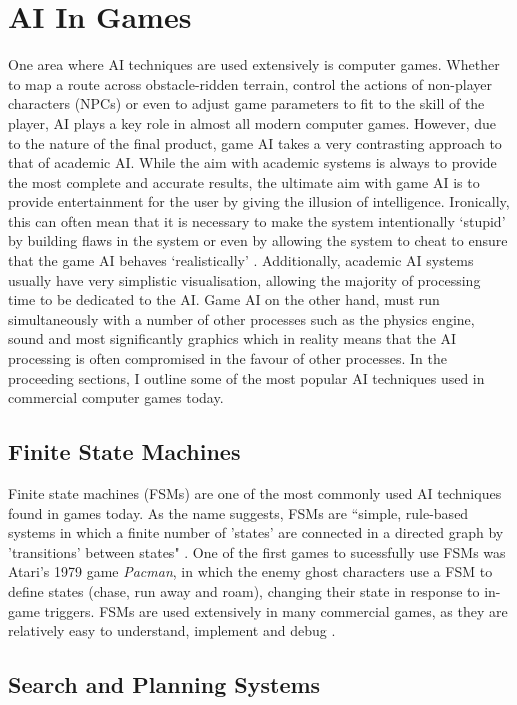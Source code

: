 \documentclass[a4paper,oneside]{report}
\begin{document}
\section{AI In Games}

One area where AI techniques are used extensively is computer games. Whether to map a route across obstacle-ridden terrain, control the actions of non-player characters (NPCs) or even to adjust game parameters to fit to the skill of the player, AI plays a key role in almost all modern computer games. However, due to the nature of the final product, game AI takes a very contrasting approach to that of academic AI. While the aim with academic systems is always to provide the most complete and accurate results, the ultimate aim with game AI is to provide entertainment for the user by giving the illusion of intelligence. Ironically, this can often mean that it is necessary to make the system intentionally `stupid' by building flaws in the system or even by allowing the system to cheat to ensure that the game AI behaves `realistically' \cite{Liden:2004fk}. Additionally, academic AI systems usually have very simplistic visualisation, allowing the majority of processing time to be dedicated to the AI. Game AI on the other hand, must run simultaneously with a number of other processes such as the physics engine, sound and most significantly graphics which in reality means that the AI processing is often compromised in the favour of other processes. In the proceeding sections, I outline some of the most popular AI techniques used in commercial computer games today.

\subsection{Finite State Machines} 

Finite state machines (FSMs) are one of the most commonly used AI techniques found in games today. As the name suggests, FSMs are ``simple, rule-based systems in which a finite number of 'states' are connected in a directed graph by 'transitions' between states" \cite{:hc}. One of the first games to sucessfully use FSMs was Atari's 1979 game \emph{Pacman}, in which the enemy ghost characters use a FSM to define states (chase, run away and roam), changing their state in response to in-game triggers. FSMs are used extensively in many commercial games, as they are relatively easy to understand, implement and debug \cite{Bourg:2004tg}.

\subsection{Search and Planning Systems} 
\end{document}
